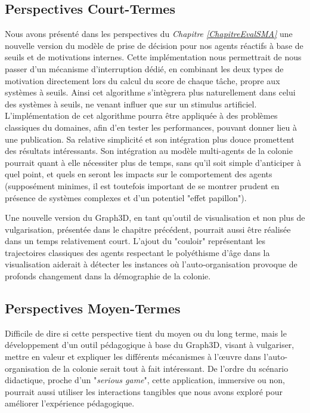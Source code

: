 	\subsection*{Perspectives Court-Termes}	
	Nous avons présenté dans les perspectives du \textit{Chapitre \ref{ChapitreEvalSMA}} une nouvelle version du modèle de prise de décision pour nos agents réactifs à base de seuils et de motivations internes. Cette implémentation nous permettrait de nous passer d'un mécanisme d'interruption dédié, en combinant les deux types de motivation directement lors du calcul du score de chaque tâche, propre aux systèmes à seuils. Ainsi cet algorithme s'intègrera plus naturellement dans celui des systèmes à seuils, ne venant influer que sur un stimulus artificiel. L'implémentation de cet algorithme pourra être appliquée à des problèmes classiques du domaines, afin d'en tester les performances, pouvant donner lieu à une publication. Sa relative simplicité et son intégration plus douce promettent des résultats intéressants. Son intégration au modèle multi-agents de la colonie pourrait quant à elle nécessiter plus de temps, sans qu'il soit simple d'anticiper à quel point, et quels en seront les impacts sur le comportement des agents (supposément minimes, il est toutefois important de se montrer prudent en présence de systèmes complexes et d'un potentiel "effet papillon").
	
	Une nouvelle version du Graph3D, en tant qu'outil de visualisation et non plus de vulgarisation, présentée dans le chapitre précédent, pourrait aussi être réalisée dans un temps relativement court. L'ajout du "couloir" représentant les trajectoires classiques des agents respectant le polyéthisme d'âge dans la visualisation aiderait à détecter les instances où l'auto-organisation provoque de profonds changement dans la démographie de la colonie.
	
	\subsection*{Perspectives Moyen-Termes}	
	Difficile de dire si cette perspective tient du moyen ou du long terme, mais le développement d'un outil pédagogique à base du Graph3D, visant à vulgariser, mettre en valeur et expliquer les différents mécanismes à l'œuvre dans l'auto-organisation de la colonie serait tout à fait intéressant. De l'ordre du scénario didactique, proche d'un "\textit{serious game}", cette application, immersive ou non, pourrait aussi utiliser les interactions tangibles que nous avons exploré pour améliorer l'expérience pédagogique.
	
